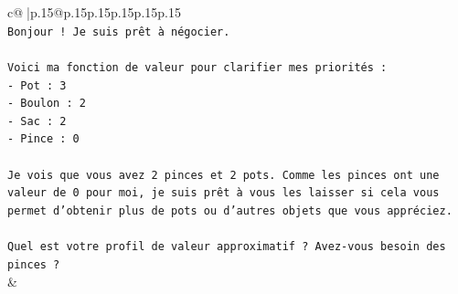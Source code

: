 \documentclass{article}
\begin{document}
{\begin{supertabular}{c@{$\;$}|p{.15\linewidth}@{}p{.15\linewidth}p{.15\linewidth}p{.15\linewidth}p{.15\linewidth}p{.15\linewidth}}
{{{\\ 
\texttt{Bonjour ! Je suis prêt à négocier.} \\
\\ 
\texttt{Voici ma fonction de valeur pour clarifier mes priorités :} \\
\texttt{{-} Pot : 3} \\
\texttt{{-} Boulon : 2} \\
\texttt{{-} Sac : 2} \\
\texttt{{-} Pince : 0} \\
\\ 
\texttt{Je vois que vous avez 2 pinces et 2 pots. Comme les pinces ont une valeur de 0 pour moi, je suis prêt à vous les laisser si cela vous permet d'obtenir plus de pots ou d'autres objets que vous appréciez.} \\
\\ 
\texttt{Quel est votre profil de valeur approximatif ? Avez{-}vous besoin des pinces ?} \\
            }
        }
    }
    & \\ \\


\end{supertabular}}
\end{document}
